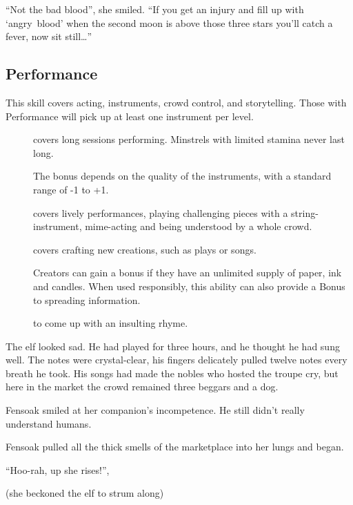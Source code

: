 \begin{multicols}{2}
\begin{exampletext}
  ``Not the bad blood'', she smiled.
  ``If you get an injury and fill up with `angry~blood' when the second moon is above those three stars you'll catch a fever, now sit still\ldots''
\end{exampletext}

\subsection{Performance}

This skill covers acting, instruments, crowd control, and storytelling.
Those with Performance will pick up at least one instrument per level.

\begin{description}
  \item[]
    covers long sessions performing.
    Minstrels with limited stamina never last long.

    The bonus depends on the quality of the instruments, with a standard range of -1 to +1.
  \item[]
    covers lively performances, playing challenging pieces with a string-instrument, mime-acting and being understood by a whole crowd.
  \item[]
    covers crafting new creations, such as plays or songs.

    Creators can gain a bonus if they have an unlimited supply of paper, ink and candles.
    When used responsibly, this ability can also provide a Bonus to spreading information.
  \item[]
    to come up with an insulting rhyme.
\end{description}

\begin{exampletext}
  The elf looked sad.
  He had played for three hours, and he thought he had sung well.
  The notes were crystal-clear, his fingers delicately pulled twelve notes every breath he took.
  His songs had made the nobles who hosted the troupe cry, but here in the market the crowd remained three beggars and a dog.

  Fensoak smiled at her companion's incompetence.
  He still didn't really understand humans.

  Fensoak pulled all the thick smells of the marketplace into her lungs and began.

  ``Hoo-rah, up she rises!'',

  (she beckoned the elf to strum along)


\end{exampletext}
\end{multicols}
